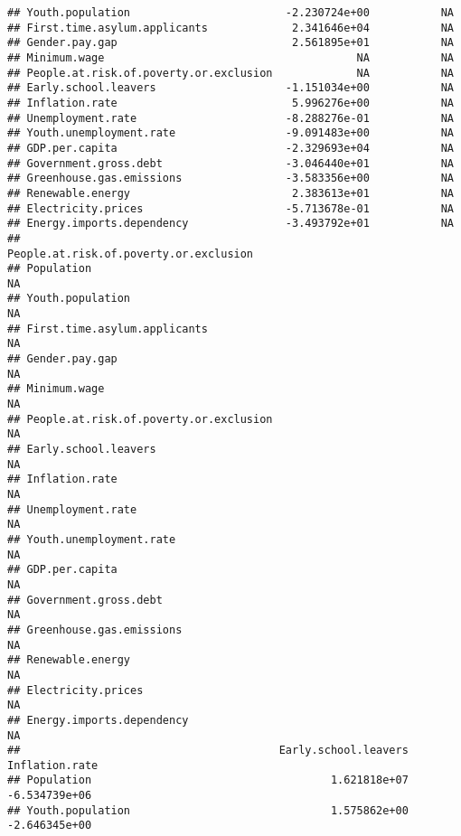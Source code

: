 \documentclass[
]{article}
\begin{document}
\begin{verbatim}
## Youth.population                        -2.230724e+00           NA
## First.time.asylum.applicants             2.341646e+04           NA
## Gender.pay.gap                           2.561895e+01           NA
## Minimum.wage                                       NA           NA
## People.at.risk.of.poverty.or.exclusion             NA           NA
## Early.school.leavers                    -1.151034e+00           NA
## Inflation.rate                           5.996276e+00           NA
## Unemployment.rate                       -8.288276e-01           NA
## Youth.unemployment.rate                 -9.091483e+00           NA
## GDP.per.capita                          -2.329693e+04           NA
## Government.gross.debt                   -3.046440e+01           NA
## Greenhouse.gas.emissions                -3.583356e+00           NA
## Renewable.energy                         2.383613e+01           NA
## Electricity.prices                      -5.713678e-01           NA
## Energy.imports.dependency               -3.493792e+01           NA
##                                        People.at.risk.of.poverty.or.exclusion
## Population                                                                 NA
## Youth.population                                                           NA
## First.time.asylum.applicants                                               NA
## Gender.pay.gap                                                             NA
## Minimum.wage                                                               NA
## People.at.risk.of.poverty.or.exclusion                                     NA
## Early.school.leavers                                                       NA
## Inflation.rate                                                             NA
## Unemployment.rate                                                          NA
## Youth.unemployment.rate                                                    NA
## GDP.per.capita                                                             NA
## Government.gross.debt                                                      NA
## Greenhouse.gas.emissions                                                   NA
## Renewable.energy                                                           NA
## Electricity.prices                                                         NA
## Energy.imports.dependency                                                  NA
##                                        Early.school.leavers Inflation.rate
## Population                                     1.621818e+07  -6.534739e+06
## Youth.population                               1.575862e+00  -2.646345e+00

\end{verbatim}
\end{document}
